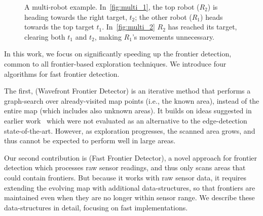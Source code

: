 \begin{figure}
 \centering 
 \caption{A multi-robot example.  In~\ref{fig:multi_1}, the top robot ($R_2$) is heading towards the right target, $t_2$; the other robot ($R_1$) heads towards the top target $t_1$. In~\ref{fig:multi_2} $R_2$ has reached its target, clearing both $t_1$ and $t_2$, making $R_1$'s movements unnecessary.}
 \label{fig:mutli_example}
\end{figure}


In this work, we focus on significantly speeding up the frontier detection, common
to all frontier-based exploration techniques.
We introduce four algorithms for fast frontier detection.

The first, \WFD (Wavefront Frontier Detector) %
is an iterative method that performs a graph-search over already-visited map
points (i.e., the known area), instead of the entire map (which includes also
unknown areas). It builds on ideas suggested in earlier
work~\cite{calisi2007multi} which were not evaluated as an
alternative to the edge-detection state-of-the-art. 
However, as exploration progresses, the scanned area grows, and thus \WFD cannot
be expected to perform well in large areas.  

Our second contribution is 
\FFD (Fast Frontier Detector), %
a novel approach for frontier detection which processes raw sensor readings,
and thus only scans areas that could contain frontiers. But because it works
with raw sensor data, it requires extending the evolving map with additional
data-structures, so that frontiers are maintained 
even when they are no longer within sensor range.
We describe these data-structures in detail, focusing on 
fast implementations.

